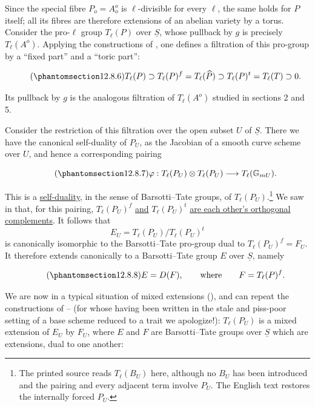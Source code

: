 \noindent
Since the special fibre $P_o=A_o^{o}$ is $\ell$-divisible for every
$\ell$, the same holds for $P$ itself; all its fibres are therefore
extensions of an abelian variety by a torus. Consider the pro-$\ell$ group
$T_\ell(P)$ over $\underline S$, whose pullback by $g$ is precisely
$T_\ell(A^{o})$. Applying the constructions of , one defines a
filtration of this pro-group by a ``fixed part'' and a ``toric part'':

\begin{equation}\tag{\SGARefTarget{sga7.sga7i.eix.n12-8-6}{12.8.6}}
 T_\ell(P)\supset T_\ell(P)^f=T_\ell(\widehat P)
 \supset T_\ell(P)^t=T_\ell(T)\supset0.
\end{equation}

\noindent
Its pullback by $g$ is the analogous filtration of $T_\ell(A^{o})$
studied in sections 2 and 5.

Consider the restriction of this filtration over the open subset $U$ of
$\underline S$. There we have the canonical self-duality of $P_U$, as the
Jacobian of a smooth curve scheme over $U$, and hence a corresponding
pairing

\begin{equation}\tag{\SGARefTarget{sga7.sga7i.eix.n12-8-7}{12.8.7}}
 \varphi:T_\ell(P_U)\otimes T_\ell(P_U)
 \longrightarrow T_\ell(\mathbb G_{mU}).
\end{equation}

\noindent
This is a \underline{self-duality}, in the sense of Barsotti--Tate groups,
of $T_\ell(P_U)$.\footnote{The printed source reads $T_\ell(B_U)$ here,
although no $B_U$ has been introduced and the pairing and every adjacent
term involve $P_U$. The English text restores the internally forced
$P_U$.} We saw in  that, for this pairing,
$T_\ell(P_U)^f$ \underline{and} $T_\ell(P_U)^t$ \underline{are each
other's orthogonal complements}. It follows that
\[
 E_U=T_\ell(P_U)/T_\ell(P_U)^t
\]
is canonically isomorphic to the Barsotti--Tate pro-group dual to
$T_\ell(P_U)^f=F_U$. It therefore extends canonically to a Barsotti--Tate
group $E$ over $\underline S$, namely

\begin{equation}\tag{\SGARefTarget{sga7.sga7i.eix.n12-8-8}{12.8.8}}
 E=D(F),\qquad\text{where}\qquad F=T_\ell(P)^f.
\end{equation}

\noindent
We are now in a typical situation of mixed extensions (), and can repeat
the constructions of -- (for whose having been written in the stale
and piss-poor setting of a base scheme reduced to a trait we apologize!):
$T_\ell(P_U)$ is a mixed extension of $E_U$ by $F_U$, where $E$ and $F$
are Barsotti--Tate groups over $\underline S$ which are extensions, dual to
one another:
